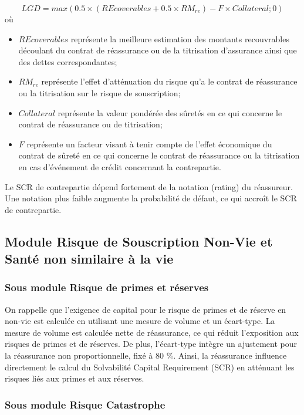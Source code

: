 \[ LGD = max(0.5\times(REcoverables + 0.5\times RM_{re}) - F\times Collateral;0)\]
où 
\begin{itemize}
    \item $REcoverables$  représente la meilleure estimation des montants recouvrables découlant du contrat de réassurance ou de la titrisation d'assurance ainsi que des dettes correspondantes;
    \item $RM_{re}$ représente l'effet d'atténuation du risque qu'a le contrat de réassurance ou la titrisation sur le risque de souscription;
    \item $Collateral$ représente la valeur pondérée des sûretés en ce qui concerne le contrat de réassurance ou de titrisation;
    \item $F$ représente un facteur visant à tenir compte de l'effet économique du contrat de sûreté en ce qui concerne le contrat de réassurance ou la titrisation en cas d'événement de crédit concernant la contrepartie. 
\end{itemize} 
Le SCR de contrepartie dépend fortement de la notation (rating) du réassureur. Une notation plus faible augmente la probabilité de défaut, ce qui accroît le SCR de contrepartie.

\subsection*{Module Risque de Souscription Non-Vie et Santé non similaire à la vie}

\subsubsection*{Sous module Risque de primes et réserves}

On rappelle que l'exigence de capital pour le risque de primes et de réserve en non-vie est calculée en utilisant une mesure de volume et un écart-type. La mesure de volume est calculée nette de réassurance, ce qui réduit l'exposition aux risques de primes et de réserves. De plus, l'écart-type intègre un ajustement pour la réassurance non proportionnelle, fixé à 80 \%. Ainsi, la réassurance influence directement le calcul du Solvabilité Capital Requirement (SCR) en atténuant les risques liés aux primes et aux réserves.

\subsubsection*{Sous module Risque Catastrophe}


